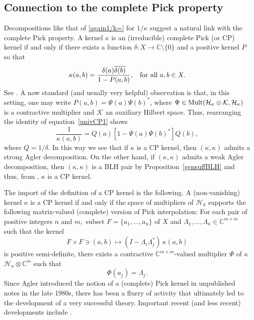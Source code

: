 \documentclass[a4paper,reqno,index]{amsart}
\numberwithin{equation}{section}
\newcommand{\CC}{\mathbb{C}}
\newcommand{\cH}{\mathcal{H}}
\newcommand{\genk}{\kappa} %
\theoremstyle{definition}
\begin{document}
\subsection{Connection to the complete Pick property}  \label{CPconnectsubsec}
Decompositions like that of \eqref{again1/k=} for $1/\genk$ suggest  a natural link with the complete Pick property.
 A kernel $\kappa$ is an (irreducible) complete Pick (or CP) kernel if and only if there exists a function $\delta:X\to\mathbb{C}\setminus\{0\}$ and a positive kernel $P$ so that
\begin{equation}\label{univCP1}
\kappa(a, b)=\frac{\delta(a)\overline{\delta(b)}}{1-P(a, b)}, \hspace{0.2 cm} \text{ for all }a,b\in X.
\end{equation} 
See 
\cite{McCulloughcarath, McCulloughlocal, Quiggin, Pickbook}. 
A now standard (and usually very helpful) observation is that, in this setting, one may write $P(a, b)=\Psi(a)\Psi(b)^*$, where $\Psi\in\textup{Mult}(\mathcal{H}_{\genk}\otimes \mathcal{K},\mathcal{H}_{\genk} )$ is a contractive multiplier and $\mathcal{K}$ an auxiliary Hilbert space.
 Thus, rearranging the identity of equation~\eqref{univCP1} 
shows
\begin{equation}   \label{univCP2}
 \frac{1}{\kappa(a,b)} = Q(a) [1-\Psi(a)\Psi(b)^*] Q(b),
\end{equation}
where $Q=1/\delta.$  In this way we see that if $\genk$ is a CP kernel, then 
$(\genk, \genk)$ admits a strong Agler decomposition. 
  On the other hand, if $(\genk,\genk)$ admits a weak Agler 
decomposition, then $(\genk,\genk)$ is a BLH pair by Proposition~\ref{gensuffBLH} and  thus, 
from \cite[Theorem~0.7]{mcctrent}, $\genk$ is a CP
kernel. 

 

 The import of the definition of a CP kernel is the following. 
 A (non-vanishing) kernel $\genk$ is a CP kernel if and only if the space of multipliers of $\cH_k$ 
 supports the following matrix-valued (complete) version of Pick interpolation: 
 For each pair of positive integers $n$ and $m,$ subset $F=\{a_1,\dots,a_n\}$ of  $X$ and 
 $\Lambda_1,\dots,\Lambda_n\in \CC^{m\times m}$ such that the kernel 
\[
 F\times F \ni (a,b) \mapsto  (I-\Lambda_i \Lambda_j^*)\, \genk(a,b) 
\]
 is positive semi-definite, there exists a contractive $\CC^{m\times m}$-valued multiplier $\Phi$ of   $\genk$ $\cH_\genk \otimes \CC^m$   such that
\[
 \Phi(a_j)=\Lambda_j.
\]
Since Agler introduced the notion of a (complete) Pick kernel in unpublished notes in the late 1980s, there has been a flurry of activity that ultimately led to the development of a very successful theory. Important recent (and less recent) developments include
 \cite{AHMRfact, Chalmsimply, weakPickprod, ColRow, Charadvances, Wickcorona, DBrtoPick}. 
\end{document}
